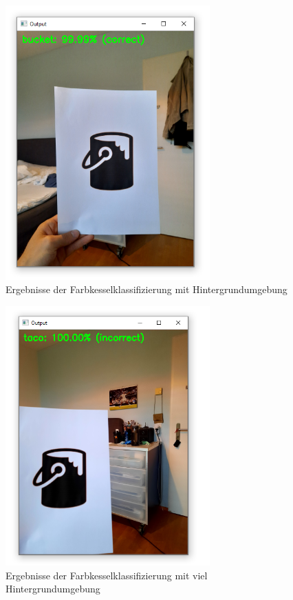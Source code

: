 \begin{figure}[H]
  \includegraphics[width=0.7\textwidth]{img/piktogrammerkennung/classifiedBucketBG.PNG}
  \centering
  \caption{Ergebnisse der Farbkesselklassifizierung mit Hintergrundumgebung}
\end{figure}

\begin{figure}[H]
  \includegraphics[width=0.7\textwidth]{img/piktogrammerkennung/notClassifiedBucketBG.PNG}
  \centering
  \caption{Ergebnisse der Farbkesselklassifizierung mit viel Hintergrundumgebung}
\end{figure}

